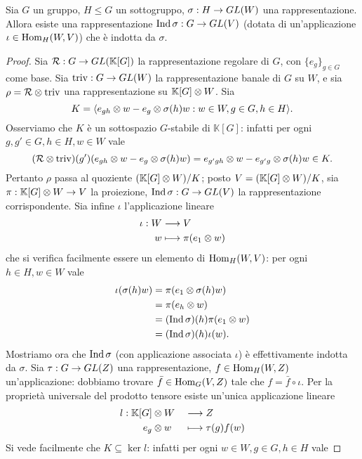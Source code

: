 \begin{proposition}
Sia $G$ un gruppo, $H\le G$ un sottogruppo, $\sigma:H\to GL(W)$ una rappresentazione. Allora esiste una rappresentazione $\operatorname{Ind}\sigma:G\to GL(V)$ (dotata di un'applicazione $\iota\in\operatorname{Hom}_H(W,V)$) che è indotta da $\sigma$.
\end{proposition}
\begin{proof}
Sia $\mathcal{R}:G\to GL(\mathbb{K}[G])$ la rappresentazione regolare di $G$, con $\{e_g\}_{g\in G}$ come base. Sia $\operatorname{triv}:G\to GL(W)$ la rappresentazione banale di $G$ su $W$, e sia $\rho=\mathcal{R}\otimes\operatorname{triv}$ una rappresentazione su $\mathbb{K}[G]\otimes W$. Sia
$$
K=\langle e_{gh}\otimes w-e_g\otimes\sigma(h)w:w\in W,g\in G,h\in H\rangle.
$$
Osserviamo che $K$ è un sottospazio $G$-stabile di $\mathbb{K}[G]$: infatti per ogni $g,g'\in G\comma h\in H\comma w\in W$ vale
$$
(\mathcal{R}\otimes\operatorname{triv})(g')(e_{gh}\otimes w-e_g\otimes\sigma(h)w)=e_{g'gh}\otimes w-e_{g'g}\otimes\sigma(h)w\in K.
$$
Pertanto $\rho$ passa al quoziente $(\mathbb{K}[G]\otimes W)/K$; posto $V=(\mathbb{K}[G]\otimes W)/K$, sia $\pi:\mathbb{K}[G]\otimes W\to V$ la proiezione, $\operatorname{Ind}\sigma:G\to GL(V)$ la rappresentazione corrispondente. Sia infine $\iota$ l'applicazione lineare
\begin{align*}
\iota:W&\longrightarrow V\\
w&\longmapsto \pi(e_1\otimes w)
\end{align*}
che si verifica facilmente essere un elemento di $\operatorname{Hom}_H(W,V)$: per ogni $h\in H\comma w\in W$ vale
\begin{align*}
\iota(\sigma(h)w)&=\pi(e_1\otimes\sigma(h)w)\\
&=\pi(e_h\otimes w)\\
&=(\operatorname{Ind}\sigma)(h)\pi(e_1\otimes w)\\
&=(\operatorname{Ind}\sigma)(h)\iota(w).
\end{align*}
Mostriamo ora che $\operatorname{Ind}\sigma$ (con applicazione associata $\iota$) è effettivamente indotta da $\sigma$. Sia $\tau:G\to GL(Z)$ una rappresentazione, $f\in\operatorname{Hom}_H(W,Z)$ un'applicazione: dobbiamo trovare $\bar{f}\in\operatorname{Hom}_G(V,Z)$ tale che $f=\bar{f}\circ\iota$. Per la proprietà universale del prodotto tensore esiste un'unica applicazione lineare
\begin{alignat*}{2}
l:\mathbb{K}[G]&\otimes W&&\longrightarrow Z\\
e_g&\otimes w&&\longmapsto\tau(g)f(w)
\end{alignat*}
Si vede facilmente che $K\subseteq\ker l$: infatti per ogni $w\in W\comma g\in G\comma h\in H$ vale

\end{proof}
